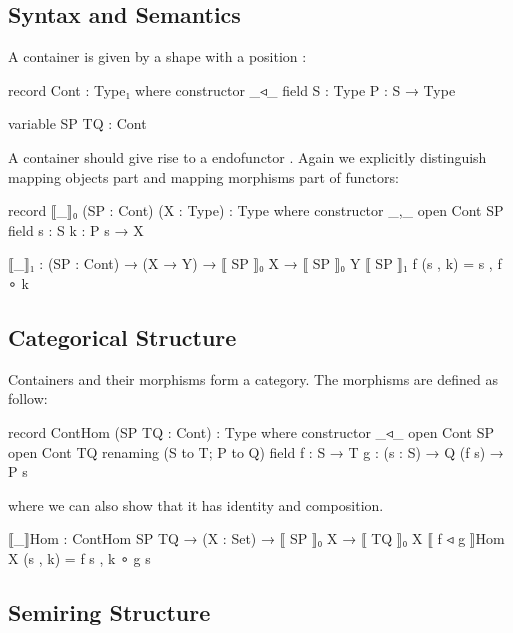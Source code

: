 \subsection{Syntax and Semantics}

A container is given by a shape  \AgdaSymbol{:}  with a position  \AgdaSymbol{:}   :

\begin{code}
record Cont : Type₁ where
  constructor _◃_
  field
    S : Type
    P : S → Type
\end{code}

\begin{code}[hide]
variable SP TQ : Cont
\end{code}

A container should give rise to a endofunctor   . Again we explicitly distinguish mapping objects part and mapping morphisms part of functors:

\begin{code}
record ⟦_⟧₀ (SP : Cont) (X : Type) : Type where
  constructor _,_
  open Cont SP
  field
    s : S
    k : P s → X

⟦_⟧₁ : (SP : Cont) → (X → Y) → ⟦ SP ⟧₀ X → ⟦ SP ⟧₀ Y
⟦ SP ⟧₁ f (s , k) = s , f ∘ k
\end{code}

\subsection{Categorical Structure}

Containers and their morphisms form a category. The morphisms are defined as follow:

\begin{code}
record ContHom (SP TQ : Cont) : Type where
  constructor _◃_
  open Cont SP
  open Cont TQ renaming (S to T; P to Q)
  field
    f : S → T
    g : (s : S) → Q (f s) → P s
\end{code}

where we can also show that it has identity and composition.

\begin{code}
⟦_⟧Hom : ContHom SP TQ → (X : Set) → ⟦ SP ⟧₀ X → ⟦ TQ ⟧₀ X
⟦ f ◃ g ⟧Hom X (s , k) = f s , k ∘ g s
\end{code}

\subsection{Semiring Structure}

